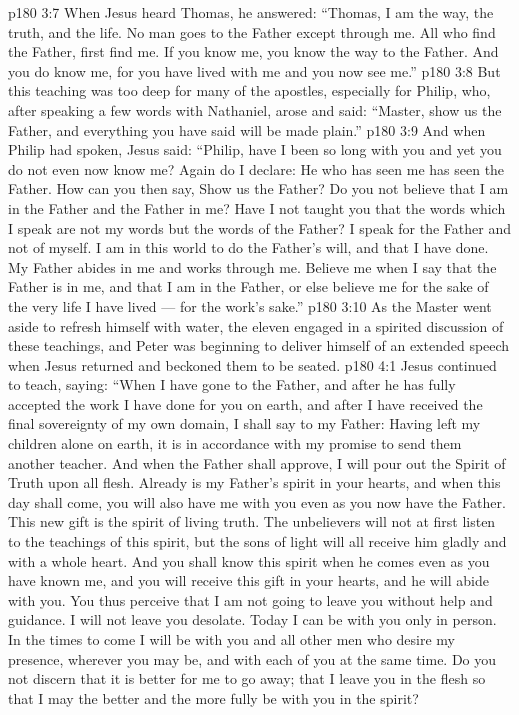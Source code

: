 \vs p180 3:7 When Jesus heard Thomas, he answered: \textcolor{ubdarkred}{“Thomas, I am the way, the truth, and the life. No man goes to the Father except through me. All who find the Father, first find me. If you know me, you know the way to the Father. And you do know me, for you have lived with me and you now see me.”}
\vs p180 3:8 But this teaching was too deep for many of the apostles, especially for Philip, who, after speaking a few words with Nathaniel, arose and said: “Master, show us the Father, and everything you have said will be made plain.”
\vs p180 3:9 And when Philip had spoken, Jesus said: \textcolor{ubdarkred}{“Philip, have I been so long with you and yet you do not even now know me? Again do I declare: He who has seen me has seen the Father. How can you then say, Show us the Father? Do you not believe that I am in the Father and the Father in me? Have I not taught you that the words which I speak are not my words but the words of the Father? I speak for the Father and not of myself. I am in this world to do the Father’s will, and that I have done. My Father abides in me and works through me. Believe me when I say that the Father is in me, and that I am in the Father, or else believe me for the sake of the very life I have lived --- for the work’s sake.”}
\vs p180 3:10 As the Master went aside to refresh himself with water, the eleven engaged in a spirited discussion of these teachings, and Peter was beginning to deliver himself of an extended speech when Jesus returned and beckoned them to be seated.
\vs p180 4:1 Jesus continued to teach, saying: \textcolor{ubdarkred}{“When I have gone to the Father, and after he has fully accepted the work I have done for you on earth, and after I have received the final sovereignty of my own domain, I shall say to my Father: Having left my children alone on earth, it is in accordance with my promise to send them another teacher. And when the Father shall approve, I will pour out the Spirit of Truth upon all flesh. Already is my Father’s spirit in your hearts, and when this day shall come, you will also have me with you even as you now have the Father. This new gift is the spirit of living truth. The unbelievers will not at first listen to the teachings of this spirit, but the sons of light will all receive him gladly and with a whole heart. And you shall know this spirit when he comes even as you have known me, and you will receive this gift in your hearts, and he will abide with you. You thus perceive that I am not going to leave you without help and guidance. I will not leave you desolate. Today I can be with you only in person. In the times to come I will be with you and all other men who desire my presence, wherever you may be, and with each of you at the same time. Do you not discern that it is better for me to go away; that I leave you in the flesh so that I may the better and the more fully be with you in the spirit?}
